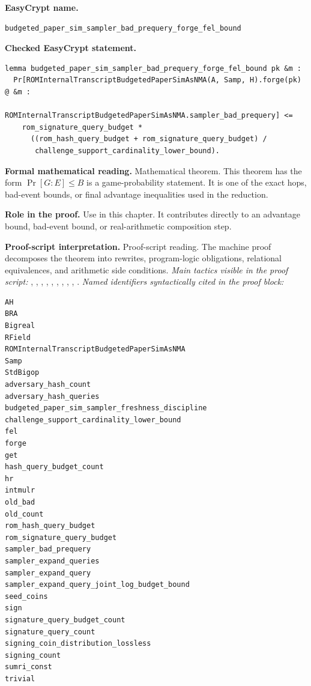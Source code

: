 \begin{formaltheorem}
\noindent\textbf{EasyCrypt name.}
\begin{lstlisting}[language=EasyCrypt,basicstyle=\ttfamily\scriptsize]
budgeted_paper_sim_sampler_bad_prequery_forge_fel_bound
\end{lstlisting}
\noindent\textbf{Checked EasyCrypt statement.}
\begin{lstlisting}[language=EasyCrypt,basicstyle=\ttfamily\scriptsize]
lemma budgeted_paper_sim_sampler_bad_prequery_forge_fel_bound pk &m :
  Pr[ROMInternalTranscriptBudgetedPaperSimAsNMA(A, Samp, H).forge(pk) @ &m :
       ROMInternalTranscriptBudgetedPaperSimAsNMA.sampler_bad_prequery] <=
    rom_signature_query_budget *
      ((rom_hash_query_budget + rom_signature_query_budget) /
       challenge_support_cardinality_lower_bound).
\end{lstlisting}
\noindent\textbf{Formal mathematical reading.}
Mathematical theorem. This theorem has the form \(\Pr[G:E] \le B\) is a game-probability statement.  It is one of the exact hops, bad-event bounds, or final advantage inequalities used in the reduction.

\noindent\textbf{Role in the proof.}
Use in this chapter. It contributes directly to an advantage bound, bad-event bound, or real-arithmetic composition step.

\noindent\textbf{Proof-script interpretation.}
Proof-script reading. The machine proof decomposes the theorem into rewrites, program-logic obligations, relational equivalences, and arithmetic side conditions.
\emph{Main tactics visible in the proof script:} , , , , , , , , , .
\emph{Named identifiers syntactically cited in the proof block:}
\begin{lstlisting}[language=EasyCrypt,basicstyle=\ttfamily\scriptsize]
AH
BRA
Bigreal
RField
ROMInternalTranscriptBudgetedPaperSimAsNMA
Samp
StdBigop
adversary_hash_count
adversary_hash_queries
budgeted_paper_sim_sampler_freshness_discipline
challenge_support_cardinality_lower_bound
fel
forge
get
hash_query_budget_count
hr
intmulr
old_bad
old_count
rom_hash_query_budget
rom_signature_query_budget
sampler_bad_prequery
sampler_expand_queries
sampler_expand_query
sampler_expand_query_joint_log_budget_bound
seed_coins
sign
signature_query_budget_count
signature_query_count
signing_coin_distribution_lossless
signing_count
sumri_const
trivial
\end{lstlisting}

\end{formaltheorem}

